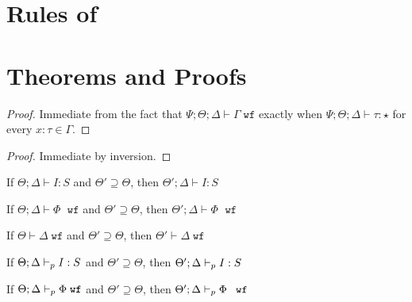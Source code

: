 
\section{Rules of \dlambdaamor}

\section{Theorems and Proofs}

\ctxwfstreng*
\begin{proof}
Immediate from the fact that $\Psi ; \Theta ; \Delta \vdash \Gamma \; \texttt{wf}$ exactly when $\Psi ; \Theta ; \Delta \vdash \tau : \star$ for every $x : \tau \in \Gamma$.
\end{proof}

\conwfstreng*
\begin{proof}
Immediate by inversion.
\end{proof}

\begin{theorem}
If $\Theta ; \Delta \vdash I : S$ and $\Theta' \supseteq \Theta$, then $\Theta' ; \Delta \vdash I : S$
\end{theorem}

\begin{theorem}
If $\Theta ; \Delta \vdash \Phi \; \texttt{ wf}$ and $\Theta' \supseteq \Theta$, then $\Theta' ; \Delta \vdash \Phi \; \texttt{ wf}$
\end{theorem}

\begin{theorem}
If $\Theta \vdash \Delta \; \texttt{wf}$ and $\Theta' \supseteq \Theta$, then $\Theta' \vdash \Delta \; \texttt{wf}$
\end{theorem}

\begin{theorem}
If $\Theta ; \Delta \vdash_p I : S$ and $\Theta' \supseteq \Theta$, then $\Theta' ; \Delta \vdash_p I : S$
\end{theorem}

\begin{theorem}
If $\Theta ; \Delta \vdash_p \Phi \; \texttt{wf}$ and $\Theta' \supseteq \Theta$, then $\Theta' ; \Delta \vdash_p \Phi \; \texttt{ wf}$
\end{theorem}

